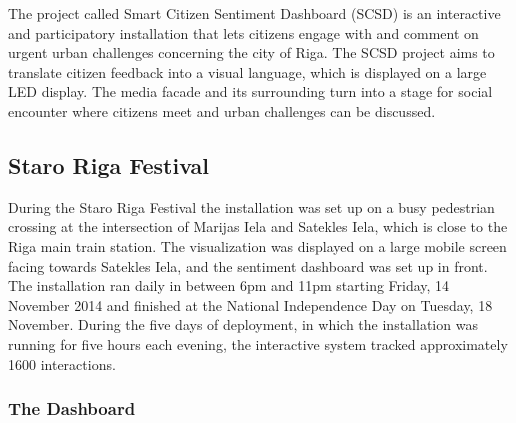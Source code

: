 The project called Smart Citizen Sentiment Dashboard (SCSD) is an interactive and participatory installation that lets citizens engage with and comment on urgent urban challenges concerning the city of Riga. The SCSD project aims to translate citizen feedback into a visual language, which is displayed on a large LED display. The media facade and its surrounding turn into a stage for social encounter where citizens meet and urban challenges can be discussed.

\subsection {Staro Riga Festival}

During the Staro Riga Festival the installation was set up on a busy pedestrian crossing at the intersection of Marijas Iela and Satekles Iela, which is close to the Riga main train station. The visualization was displayed on a large mobile screen facing towards Satekles Iela, and the sentiment dashboard was set up in front. The installation ran daily in between 6pm and 11pm starting Friday, 14 November 2014 and finished at the National Independence Day on Tuesday, 18 November. During the five days of deployment, in which the installation was running for five hours each evening, the interactive system tracked approximately 1600 interactions.

\subsubsection{The Dashboard}

